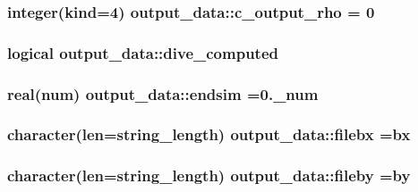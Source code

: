 \subsubsection[{\texorpdfstring{c\+\_\+output\+\_\+rho}{c_output_rho}}]{\setlength{\rightskip}{0pt plus 5cm}integer(kind=4) output\+\_\+data\+::c\+\_\+output\+\_\+rho = 0}\hypertarget{namespaceoutput__data_afab9a486a2aff0dc3d89dbbcc7bb3007}{}\label{namespaceoutput__data_afab9a486a2aff0dc3d89dbbcc7bb3007}
\subsubsection[{\texorpdfstring{dive\+\_\+computed}{dive_computed}}]{\setlength{\rightskip}{0pt plus 5cm}logical output\+\_\+data\+::dive\+\_\+computed}\hypertarget{namespaceoutput__data_abc6cc1ed098892996b0f0dd858e410d1}{}\label{namespaceoutput__data_abc6cc1ed098892996b0f0dd858e410d1}
\subsubsection[{\texorpdfstring{endsim}{endsim}}]{\setlength{\rightskip}{0pt plus 5cm}real(num) output\+\_\+data\+::endsim =0.\+\_\+num}\hypertarget{namespaceoutput__data_a1ed464801538daa68f0f138d06be9c8a}{}\label{namespaceoutput__data_a1ed464801538daa68f0f138d06be9c8a}
\subsubsection[{\texorpdfstring{filebx}{filebx}}]{\setlength{\rightskip}{0pt plus 5cm}character(len=string\+\_\+length) output\+\_\+data\+::filebx =\textquotesingle{}bx\textquotesingle{}}\hypertarget{namespaceoutput__data_ac0a6ec606c33d1bc037b5ce85a9f4b3a}{}\label{namespaceoutput__data_ac0a6ec606c33d1bc037b5ce85a9f4b3a}
\subsubsection[{\texorpdfstring{fileby}{fileby}}]{\setlength{\rightskip}{0pt plus 5cm}character(len=string\+\_\+length) output\+\_\+data\+::fileby =\textquotesingle{}by\textquotesingle{}}\hypertarget{namespaceoutput__data_ac6e874f0a8121e42bed35e449a4a7c38}{}\label{namespaceoutput__data_ac6e874f0a8121e42bed35e449a4a7c38}
